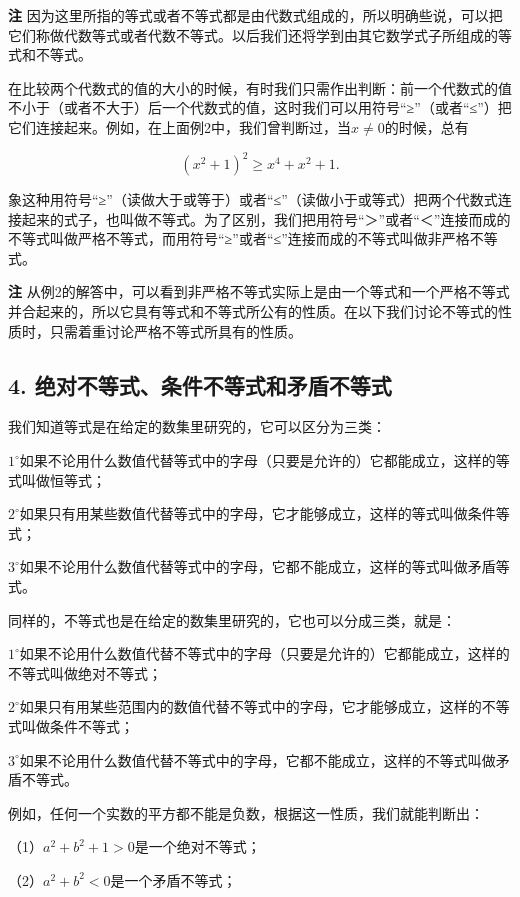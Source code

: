 \textbf{注}
因为这里所指的等式或者不等式都是由代数式组成的，所以明确些说，可以把它们称做代数等式或者代数不等式。以后我们还将学到由其它数学式子所组成的等式和不等式。

在比较两个代数式的值的大小的时候，有时我们只需作出判断：前一个代数式的值不小于（或者不大于）后一个代数式的值，这时我们可以用符号``≥''（或者``≤''）把它们连接起来。例如，在上面例2中，我们曾判断过，当\(x\neq0\)的时候，总有

\[
(x^{2} + 1)^{2} \geqslant x^{4} + x^{2} + 1.
\]

象这种用符号``≥''（读做大于或等于）或者``≤''（读做小于或等式）把两个代数式连接起来的式子，也叫做不等式。为了区别，我们把用符号``＞''或者``＜''连接而成的不等式叫做严格不等式，而用符号``≥''或者``≤''连接而成的不等式叫做非严格不等式。

\textbf{注}
从例2的解答中，可以看到非严格不等式实际上是由一个等式和一个严格不等式并合起来的，所以它具有等式和不等式所公有的性质。在以下我们讨论不等式的性质时，只需着重讨论严格不等式所具有的性质。

\subsection{4. 绝对不等式、条件不等式和矛盾不等式}

我们知道等式是在给定的数集里研究的，它可以区分为三类：

\(1^{\circ}\)如果不论用什么数值代替等式中的字母（只要是允许的）它都能成立，这样的等式叫做恒等式；

\(2^{\circ}\)如果只有用某些数值代替等式中的字母，它才能够成立，这样的等式叫做条件等式；

\(3^{\circ}\)如果不论用什么数值代替等式中的字母，它都不能成立，这样的等式叫做矛盾等式。

同样的，不等式也是在给定的数集里研究的，它也可以分成三类，就是：

\(1^{\circ}\)如果不论用什么数值代替不等式中的字母（只要是允许的）它都能成立，这样的不等式叫做绝对不等式；

\(2^{\circ}\)如果只有用某些范围内的数值代替不等式中的字母，它才能够成立，这样的不等式叫做条件不等式；

\(3^{\circ}\)如果不论用什么数值代替不等式中的字母，它都不能成立，这样的不等式叫做矛盾不等式。

例如，任何一个实数的平方都不能是负数，根据这一性质，我们就能判断出：

（1）\(a^2+b^2+1 > 0\)是一个绝对不等式；

（2）\(a^2 + b^2 < 0\)是一个矛盾不等式；

